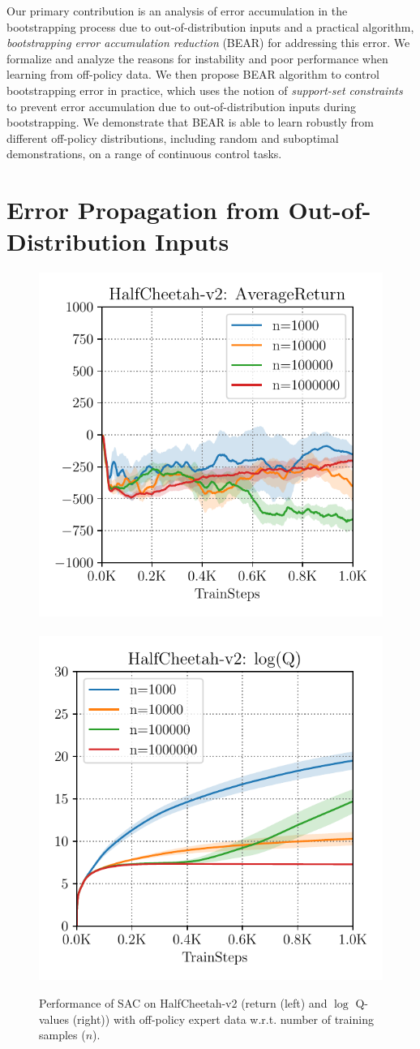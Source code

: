\documentclass{article}
\begin{document}
Our primary contribution is an analysis of error accumulation in the bootstrapping process due to out-of-distribution inputs and a practical algorithm, \emph{bootstrapping error accumulation reduction} (BEAR) for addressing this error. We formalize and analyze the reasons for instability and poor performance when learning from off-policy data. We then propose BEAR algorithm to control bootstrapping error in practice, which uses the notion of \emph{support-set constraints} to prevent error accumulation due to out-of-distribution inputs during bootstrapping. We demonstrate that BEAR is able to learn robustly from different off-policy distributions, including random and suboptimal demonstrations, on a range of continuous control tasks.

\vspace{-11pt}
\section{Error Propagation from Out-of-Distribution Inputs}
\vspace{-10pt}
\begin{figure}
\vspace{-10pt}
\begin{center}
\vspace{-0.1in}
    \includegraphics[width=0.48\linewidth]{images/cheetah_divergence.pdf}
    ~
    \includegraphics[width=0.48\linewidth]{images/cheetah_divergence_q_val.pdf}
  \end{center}
 \vspace{-10pt}
\caption{ \footnotesize Performance of SAC on HalfCheetah-v2 (return (left) and $\log$ Q-values (right)) with off-policy expert data w.r.t. number of training samples ($n$).} 
 \vspace{-15pt}
 \label{fig:divergence}
\end{figure}
\end{document}

